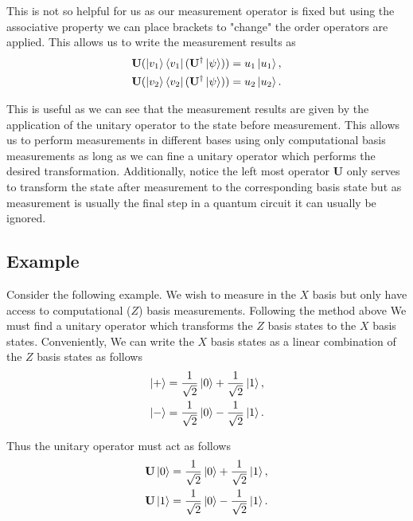 \documentclass[12pt]{article}
\begin{document}
    This is not so helpful for us as our measurement operator is fixed but using the associative property we can place brackets to "change" the order operators are applied. This allows us to write the measurement results as
    \begin{align*}
        \mathbf{U} (\ket{v_1} \bra{v_1} (\mathbf{U}^\dagger \ket{\psi})) &= u_1 \ket{u_1}, \\
        \mathbf{U} (\ket{v_2} \bra{v_2} (\mathbf{U}^\dagger \ket{\psi})) &= u_2 \ket{u_2}.
    \end{align*}

    This is useful as we can see that the measurement results are given by the application of the unitary operator to the state before measurement. This allows us to perform measurements in different bases using only computational basis measurements as long as we can fine a unitary operator which performs the desired transformation. Additionally, notice the left most operator $\mathbf{U}$ only serves to transform the state after measurement to the corresponding basis state but as measurement is usually the final step in a quantum circuit it can usually be ignored.

    \subsection{Example}
    Consider the following example. We wish to measure in the $X$ basis but only have access to computational ($Z$) basis measurements. Following the method above We must find a unitary operator which transforms the $Z$ basis states to the $X$ basis states. Conveniently, We can write the $X$ basis states as a linear combination of the $Z$ basis states as follows
    \begin{align*}
        \ket{+} &= \frac{1}{\sqrt{2}}\ket{0} + \frac{1}{\sqrt{2}}\ket{1}, \\
        \ket{-} &= \frac{1}{\sqrt{2}}\ket{0} - \frac{1}{\sqrt{2}}\ket{1}.
    \end{align*}

    Thus the unitary operator must act as follows
    \begin{align*}
        \mathbf{U} \ket{0} &= \frac{1}{\sqrt{2}}\ket{0} + \frac{1}{\sqrt{2}}\ket{1}, \\
        \mathbf{U} \ket{1} &= \frac{1}{\sqrt{2}}\ket{0} - \frac{1}{\sqrt{2}}\ket{1}.
    \end{align*}
\end{document}
